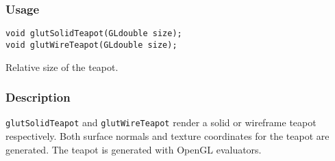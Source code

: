 \subsubsection*{Usage}
\begin{verbatim}
void glutSolidTeapot(GLdouble size);
void glutWireTeapot(GLdouble size);
\end{verbatim}
\begin{description}
\itemsep 0in
\item[{\tt size}] Relative size of the teapot.
\end{description}

\subsubsection*{Description}

{\tt glutSolidTeapot} and {\tt glutWireTeapot} render a solid or
wireframe teapot respectively.  Both surface normals and texture
coordinates for the teapot are generated.  The teapot is generated with
OpenGL evaluators.

